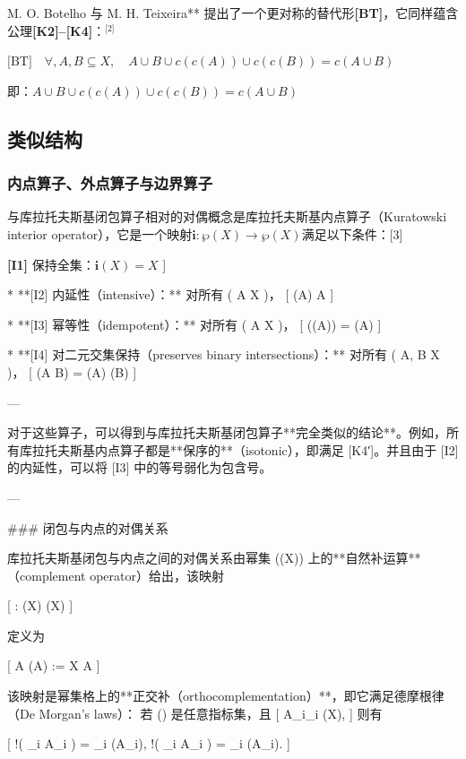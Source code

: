 M. O. Botelho 与 M. H. Teixeira** 提出了一个更对称的替代形\textbf{[BT]}，它同样蕴含公理\textbf{[K2]–[K4]}：\(^\text{[2]}\)

$\text{[BT]}\quad \forall, A,B \subseteq X, \quad A \cup B \cup c(c(A)) \cup c(c(B)) = c(A \cup B)$

即：$A \cup B \cup c(c(A)) \cup c(c(B)) = c(A \cup B)$
\subsection{类似结构}
\subsubsection{内点算子、外点算子与边界算子}
与库拉托夫斯基闭包算子相对的对偶概念是库拉托夫斯基内点算子（Kuratowski interior operator），它是一个映射$\mathbf{i} : \wp(X) \to \wp(X)$满足以下条件：[3]

\textbf{[I1]} 保持全集：$\mathbf{i}(X) = X$
  ]

* **[I2] 内延性（intensive）：** 对所有 ( A \subseteq X )，
  [
  (A) \subseteq A
  ]

* **[I3] 幂等性（idempotent）：** 对所有 ( A \subseteq X )，
  [
  ((A)) = (A)
  ]

* **[I4] 对二元交集保持（preserves binary intersections）：** 对所有 ( A, B \subseteq X )，
  [
  (A \cap B) = (A) \cap {}(B)
  ]

---

对于这些算子，可以得到与库拉托夫斯基闭包算子**完全类似的结论**。例如，所有库拉托夫斯基内点算子都是**保序的**（isotonic），即满足 [K4′]。并且由于 [I2] 的内延性，可以将 [I3] 中的等号弱化为包含号。

---

### 闭包与内点的对偶关系

库拉托夫斯基闭包与内点之间的对偶关系由幂集 (\wp(X)) 上的**自然补运算**（complement operator）给出，该映射

[
 : \wp(X) \to \wp(X)
]

定义为

[
A \mapsto {}(A) := X \setminus A
]

该映射是幂集格上的**正交补（orthocomplementation）**，即它满足德摩根律（De Morgan’s laws）：
若 () 是任意指标集，且
[
{A_i}_{i \in {}} \subseteq \wp(X),
]
则有

[
!\left( \bigcup_{i \in {}} A_i \right) = \bigcap_{i \in {}} (A_i),
\quad
{}!\left( \bigcap_{i \in {}} A_i \right) = \bigcup_{i \in {}} (A_i).
]

